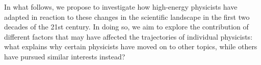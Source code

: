 \documentclass{article}
\begin{document}

In what follows, we propose to investigate how high-energy physicists have adapted in reaction to these changes in the scientific landscape in the first two decades of the 21st century. In doing so, we aim to explore the contribution of different factors that may have affected the trajectories of individual physicists: what explains why certain physicists have moved on to other topics, while others have pursued similar interests instead? 



\end{document}
